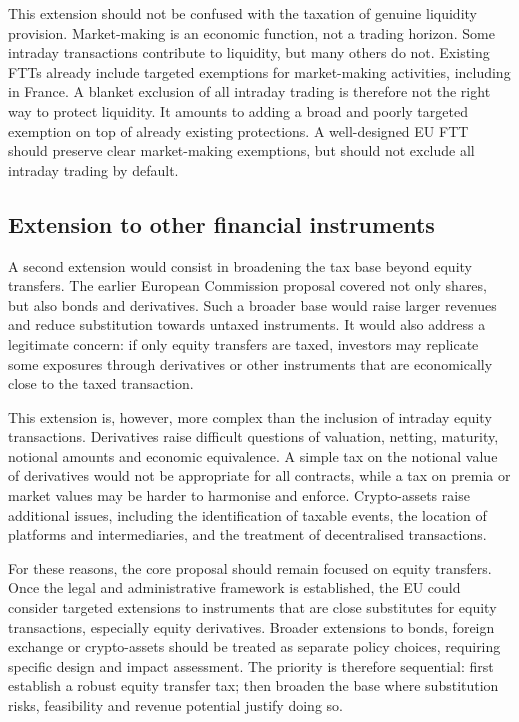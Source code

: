 \documentclass[../../main]{subfiles}
\begin{document}
This extension should not be confused with the taxation of genuine liquidity provision. Market-making is an economic function, not a trading horizon. Some intraday transactions contribute to liquidity, but many others do not. Existing FTTs already include targeted exemptions for market-making activities, including in France. A blanket exclusion of all intraday trading is therefore not the right way to protect liquidity. It amounts to adding a broad and poorly targeted exemption on top of already existing protections. A well-designed EU FTT should preserve clear market-making exemptions, but should not exclude all intraday trading by default.

\subsection{Extension to other financial instruments}

A second extension would consist in broadening the tax base beyond equity transfers. The earlier European Commission proposal covered not only shares, but also bonds and derivatives. Such a broader base would raise larger revenues and reduce substitution towards untaxed instruments. It would also address a legitimate concern: if only equity transfers are taxed, investors may replicate some exposures through derivatives or other instruments that are economically close to the taxed transaction.

This extension is, however, more complex than the inclusion of intraday equity transactions. Derivatives raise difficult questions of valuation, netting, maturity, notional amounts and economic equivalence. A simple tax on the notional value of derivatives would not be appropriate for all contracts, while a tax on premia or market values may be harder to harmonise and enforce. Crypto-assets raise additional issues, including the identification of taxable events, the location of platforms and intermediaries, and the treatment of decentralised transactions.

For these reasons, the core proposal should remain focused on equity transfers. Once the legal and administrative framework is established, the EU could consider targeted extensions to instruments that are close substitutes for equity transactions, especially equity derivatives. Broader extensions to bonds, foreign exchange or crypto-assets should be treated as separate policy choices, requiring specific design and impact assessment. The priority is therefore sequential: first establish a robust equity transfer tax; then broaden the base where substitution risks, feasibility and revenue potential justify doing so.

\end{document}
